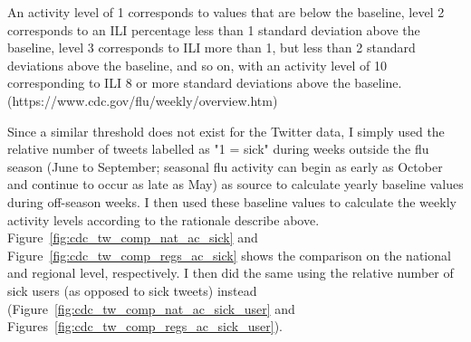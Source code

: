 \documentclass[11pt, a4paper]{report}\usepackage[]{graphicx}\usepackage[]{color}
\begin{document}
An activity level of 1 corresponds to values that are below the baseline, level 2 corresponds to an ILI percentage less than 1 standard deviation above the baseline, level 3 corresponds to ILI more than 1, but less than 2 standard deviations above the baseline, and so on, with an activity level of 10 corresponding to ILI 8 or more standard deviations above the baseline. (https://www.cdc.gov/flu/weekly/overview.htm)\newline
  
Since a similar threshold does not exist for the Twitter data, I simply used the relative number of tweets labelled as "1 = sick" during weeks outside the flu season (June to September; seasonal flu activity can begin as early as October and continue to occur as late as May) as source to calculate yearly baseline values during off-season weeks. I then used these baseline values to calculate the weekly activity levels according to the rationale describe above. Figure~\ref{fig:cdc_tw_comp_nat_ac_sick} and Figure~\ref{fig:cdc_tw_comp_regs_ac_sick} shows the comparison on the national and regional level, respectively. I then did the same using the relative number of sick users (as opposed to sick tweets) instead (Figure~\ref{fig:cdc_tw_comp_nat_ac_sick_user} and Figures~\ref{fig:cdc_tw_comp_regs_ac_sick_user}).
\end{document}
